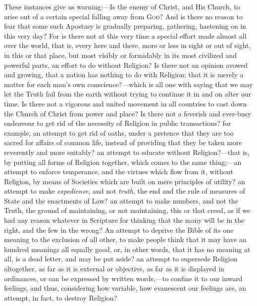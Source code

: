 These instances give us warning:—Is the enemy of Christ, and His
Church, to arise out of a certain special falling away from G\textsc{od}? And
is there no reason to fear that some such Apostasy is gradually
preparing, gathering, hastening on in this very day? For is there not
at this very time a special effort made almost all over the world,
that is, every here and there, more or less in sight or out of sight,
in this or that place, but most visibly or formidably in its most
civilized and powerful parts, an effort to do without Religion? Is
there not an opinion avowed and growing, that a nation has nothing to
do with Religion; that it is merely a matter for each man's own
conscience?—which is all one with saying that we may let the Truth
fail from the earth without trying to continue it in and on after our
time. Is there not a vigorous and united movement in all countries to
cast down the Church of Christ from power and place? Is there not a
feverish and ever-busy endeavour to get rid of the necessity of
Religion in public transactions? for example, an attempt to get rid of
oaths, under a pretence that they are too sacred for affairs of common
life, instead of providing that they be taken more reverently and more
suitably? an attempt to educate without Religion?—that is, by
putting all forms of Religion together, which comes to the same thing;—an
attempt to enforce temperance, and the virtues which flow from it,
without Religion, by means of Societies which are built on mere
principles of utility? an attempt to make \emph{expedience}, and not \emph{truth},
the end and the rule of measures of State and the enactments of Law?
an attempt to make numbers, and not the Truth, the ground of
maintaining, or not maintaining, this or that creed, as if we had any
reason whatever in Scripture for thinking that the many will be in the
right, and the few in the wrong? An attempt to deprive the Bible
of its one meaning to the exclusion of all other, to make people think
that it may have an hundred meanings all equally good, or, in other
words, that it has no meaning at all, is a dead letter, and may be put
aside? an attempt to supersede Religion altogether, as far as it is
external or objective, as far as it is displayed in ordinances, or can
be expressed by written words,—to confine it to our inward feelings,
and thus, considering how variable, how evanescent our feelings are,
an attempt, in fact, to destroy Religion?


